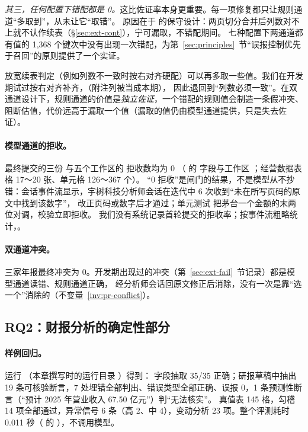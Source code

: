\emph{其三，任何配置下错配都是 0。}这比佐证率本身更重要。每一项修复都只让规则通道“多取到”，从未让它“取错”。
原因在于  的保守设计：两页切分合并后列数对不上就不认作续表（\S\ref{sec:ext-cont}），宁可漏取，不错配期间。
七种配置下两通道都有值的 1,368 个键次中没有出现一次错配，为第~\ref{sec:principles}~节“误报控制优先于召回”的原则提供了一个实证。

\begin{tradeoff}[：续表判定宁严勿宽]
放宽续表判定（例如列数不一致时按右对齐硬配）可以再多取一些值。我们在开发期试过按右对齐补齐，（附注列被当成本期），
因此退回到“列数必须一致”。在双通道设计下，规则通道的价值是\emph{独立佐证}，一个错配的规则值会制造一条假冲突、阻断估值，代价远高于漏取一个值（漏取的值仍由模型通道提供，只是失去佐证）。
\end{tradeoff}

\paragraph{模型通道的拒收。}最终提交的三份  与五个工作区的  拒收数均为 0
（ 的  字段与工作区 ；经营数据表格 17～20 张、单元格 126～367 个）。
“0 拒收”是闸门的结果，不是模型从不抄错：会话事件流显示，宇树科技分析师会话在迭代中 6 次收到“未在所写页码的原文中找到该数字”，
改正页码或数字后才通过；单元测试  把茅台一个金额的末两位对调，校验立即拒收。
我们没有系统记录首轮提交的拒收率；按事件流粗略统计，。

\paragraph{双通道冲突。}三家年报最终冲突为 0。开发期出现过的冲突（第~\ref{sec:ext-fail}~节记录）都是模型通道读错、规则通道正确，
经分析师会话回原文修正后消除，没有一次是靠“选一个”消除的（不变量~\ref{inv:pr-conflict}）。

\subsection{RQ2：财报分析的确定性部分}
\label{sec:exp-rq2}

\paragraph{样例回归。}运行 （本章撰写时的运行目录 ）得到：
字段抽取 35/35 正确；研报草稿中抽出 19 条可核验断言，7 处埋错全部判出、错误类型全部正确、误报 0，1 条预测性断言（“预计 2025 年营业收入 67.50 亿元”）判“无法核实”。
真值表 145 格，勾稽 14 项全部通过，异常信号 6 条（高 2、中 4），变动分析 23 项。整个评测耗时 0.011 秒（ 的 ），不调用模型。

